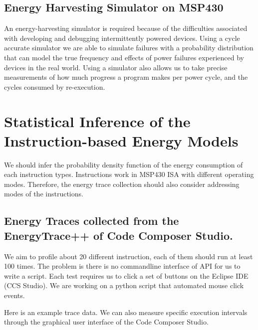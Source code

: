 \documentclass[]{article}
\begin{document}
\hypertarget{energy-harvesting-simulator-on-msp430}{%
\subsection{Energy Harvesting Simulator on MSP430}\label{energy-harvesting-simulator-on-msp430}}

An energy-harvesting simulator is required because of the difficulties associated with developing and debugging intermittently powered devices. Using a cycle accurate simulator we are able to simulate failures with a probability distribution that can model the true frequency and effects of power failures experienced by devices in the real world. Using a simulator also allows us to take precise measurements of how much progress a program makes per power cycle, and the cycles consumed by re-execution.

\hypertarget{statistical-inference-of-the-instruction-based-energy-models}{%
\section{Statistical Inference of the Instruction-based Energy Models}\label{statistical-inference-of-the-instruction-based-energy-models}}

We should infer the probability density function of the energy consumption of each instruction types. Instructions work in MSP430 ISA with different operating modes. Therefore, the energy trace collection should also consider addressing modes of the instructions.

\hypertarget{energy-traces-collected-from-the-energytrace-of-code-composer-studio.}{%
\subsection{Energy Traces collected from the EnergyTrace++ of Code Composer Studio.}\label{energy-traces-collected-from-the-energytrace-of-code-composer-studio.}}

We aim to profile about 20 different instruction, each of them should run at least 100 times. The problem is there is no commandline interface of API for us to write a script. Each test requires us to click a set of buttons on the Eclipse IDE (CCS Studio). We are working on a python script that automated mouse click events.

Here is an example trace data. We can also measure specific execution intervals through the graphical user interface of the Code Composer Studio.
\end{document}

